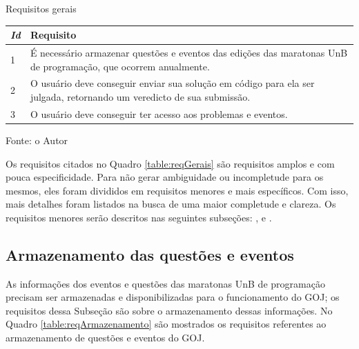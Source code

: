 \begin{quadro}
    \caption{Requisitos gerais}
    \centering
    \label{table:reqGerais}
    \begin{threeparttable}
    \begin{tabular}{ |p{0.5cm}|p{10cm}|  }
        \hline
        
        \textit{\textbf{Id}} & 
        \textbf{Requisito} \\
        \hline
        
        1 & É necessário armazenar questões e eventos das edições das maratonas UnB de programação, que ocorrem anualmente.  \\
        \hline
        
        2 & O usuário deve conseguir enviar sua solução em código para ela ser julgada, retornando um veredicto de sua submissão.  \\ 
        \hline
        
        3 & O usuário deve conseguir ter acesso aos problemas e eventos.  \\
        \hline
    \end{tabular}
    \medskip
    \begin{tablenotes}
        \centering
        \item Fonte: o Autor
    \end{tablenotes}
    \end{threeparttable}

\end{quadro}

Os requisitos citados no Quadro \ref{table:reqGerais} são requisitos amplos e com pouca especificidade. Para não gerar ambiguidade ou incompletude para os mesmos, eles foram divididos em requisitos menores e mais específicos. Com isso, mais detalhes foram listados na busca de uma maior completude e clareza. Os requisitos menores serão descritos nas seguintes subseções: ,  e .

\subsection{Armazenamento das questões e eventos}
\label{subsec:storage}

As informações dos eventos e questões das maratonas UnB de programação precisam ser armazenadas e disponibilizadas para o funcionamento do GOJ; os requisitos dessa Subseção são sobre o armazenamento dessas informações. No Quadro \ref{table:reqArmazenamento} são mostrados os requisitos referentes ao armazenamento de questões e eventos do GOJ.

